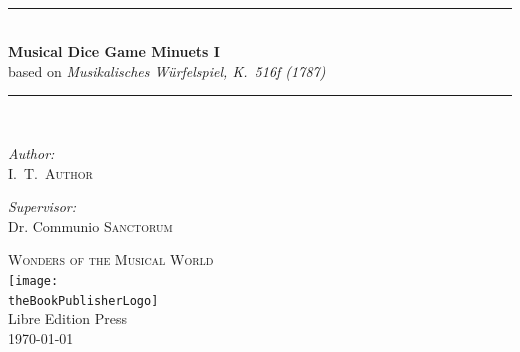 \documentclass[letterpaper,x11names,svgnames,10pt]{article}
\title{\textsc{\mdgBookTitle}}
\author{\textsc{\authorFirstMidNameInit \authorLastName}}
\date{\textsc{\dateGenerated}}
\def\authorFirstMidNameInit{I.\ T.\ }
\def\authorLastName{Author}
\def\dateGenerated{\today}
\def\volNumber{I}
\def\mdgBookTitle{Musical Dice Game Minuets \volNumber}
\def\mdgBookSubTitle{Musikalisches W\"{u}rfelspiel, K.\ 516f (1787)}
\def\theBookSeries{Wonders of the Musical World}
\def\theBookPublisher{Libre Edition Press}
\def\theBookPublisherLogo{../images/1.png}
\newcommand{\HRule}{\rule{\linewidth}{0.5mm}}
\begin{document}


\newpage

${}_{}$\\
\vspace{1.00in}	
\thispagestyle{empty}
\begin{center}
	\HRule \\[0.4cm]
	{\huge \bfseries \mdgBookTitle} \\[0.2cm]
	{\large based on {\em \mdgBookSubTitle} }\\[0.2cm]
	\HRule \\[1.5cm]
	\begin{minipage}{0.4\textwidth}
		\begin{flushleft} \large
			\emph{Author:}\\
			\authorFirstMidNameInit \textsc{\authorLastName}
		\end{flushleft}
	\end{minipage}
	\begin{minipage}{0.4\textwidth}
		\begin{flushright} \large
			\emph{Supervisor:} \\
			Dr. Communio \textsc{Sanctorum}
		\end{flushright}
	\end{minipage}
	\vfill
	{\textsc{\Large \theBookSeries}}  \\[0.2cm] 
	\texttt{[image: \\theBookPublisherLogo]}\\ 
	{\large \theBookPublisher \\
       \dateGenerated }\\
	\vspace{2.50in}
\end{center}
\newpage


\tableofcontents\label{tabofcon}

\end{document}
